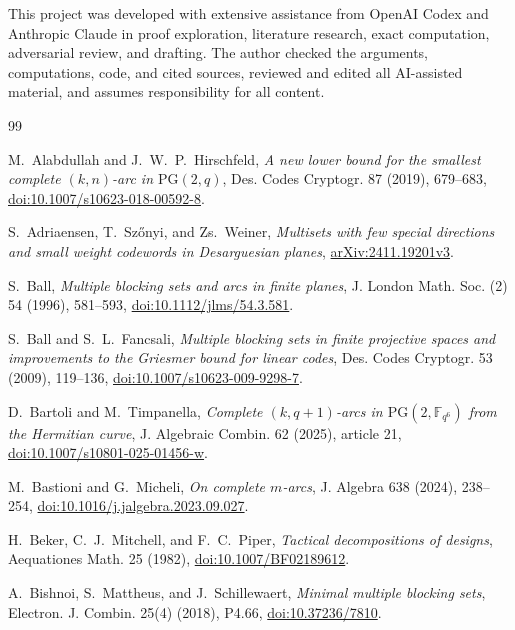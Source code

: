 \documentclass[11pt]{article}
\numberwithin{equation}{section}
\theoremstyle{definition}
\theoremstyle{remark}
\newcommand{\PG}{\mathrm{PG}}
\begin{document}
This project was developed with extensive assistance from OpenAI Codex and
Anthropic Claude in proof exploration, literature research, exact computation,
adversarial review, and drafting.  The author checked the arguments,
computations, code, and cited sources, reviewed and edited all AI-assisted
material, and assumes responsibility for all content.

\footnotesize
\raggedright
\begin{thebibliography}{99}

M.~Alabdullah and J.~W.~P.~Hirschfeld,
\emph{A new lower bound for the smallest complete \((k,n)\)-arc in
\(\PG(2,q)\)}, Des. Codes Cryptogr. 87 (2019), 679--683,
\href{https://doi.org/10.1007/s10623-018-00592-8}{doi:10.1007/s10623-018-00592-8}.

S.~Adriaensen, T.~Sz\H{o}nyi, and Zs.~Weiner,
\emph{Multisets with few special directions and small weight codewords in
Desarguesian planes},
\href{https://arxiv.org/abs/2411.19201}{arXiv:2411.19201v3}.

S.~Ball,
\emph{Multiple blocking sets and arcs in finite planes}, J. London Math.
Soc. (2) 54 (1996), 581--593,
\href{https://doi.org/10.1112/jlms/54.3.581}{doi:10.1112/jlms/54.3.581}.

S.~Ball and S.~L.~Fancsali,
\emph{Multiple blocking sets in finite projective spaces and improvements to
the Griesmer bound for linear codes}, Des. Codes Cryptogr. 53 (2009),
119--136,
\href{https://doi.org/10.1007/s10623-009-9298-7}{doi:10.1007/s10623-009-9298-7}.

D.~Bartoli and M.~Timpanella,
\emph{Complete \((k,q+1)\)-arcs in \(\PG(2,\mathbb F_{q^6})\) from the
Hermitian curve}, J. Algebraic Combin. 62 (2025), article 21,
\href{https://doi.org/10.1007/s10801-025-01456-w}{doi:10.1007/s10801-025-01456-w}.

M.~Bastioni and G.~Micheli,
\emph{On complete \(m\)-arcs}, J. Algebra 638 (2024), 238--254,
\href{https://doi.org/10.1016/j.jalgebra.2023.09.027}{doi:10.1016/j.jalgebra.2023.09.027}.

H.~Beker, C.~J.~Mitchell, and F.~C.~Piper,
\emph{Tactical decompositions of designs}, Aequationes Math. 25 (1982),
\href{https://doi.org/10.1007/BF02189612}{doi:10.1007/BF02189612}.

A.~Bishnoi, S.~Mattheus, and J.~Schillewaert,
\emph{Minimal multiple blocking sets}, Electron. J. Combin. 25(4) (2018),
P4.66,
\href{https://doi.org/10.37236/7810}{doi:10.37236/7810}.


\end{thebibliography}
\end{document}
